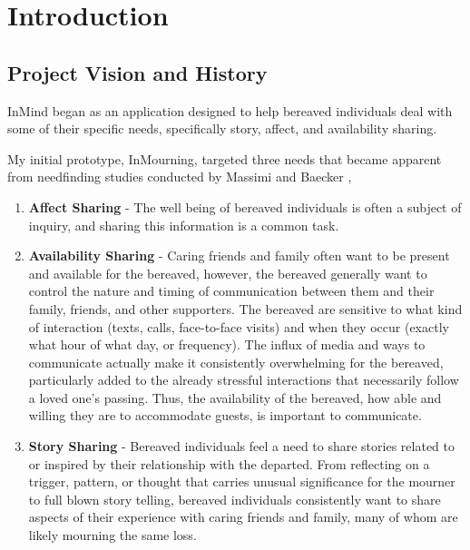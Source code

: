 \chapter{Introduction}
\section{Project Vision and History}
\label{sec:vision}
  InMind began as an application designed to help bereaved individuals deal with
  some of their specific needs, specifically story, affect, and availability sharing.

  My initial prototype, InMourning, targeted three needs that became apparent
  from needfinding studies conducted by Massimi and
  Baecker \cite{mm11a, mm10, mm13},

  \begin{enumerate}
  \item \textbf{Affect Sharing} - The well being of bereaved individuals is often a subject
    of inquiry, and sharing this information is a common task.
  \item \textbf{Availability Sharing} -
    Caring friends and family often want to be present
    and available for the bereaved, however,
    the bereaved generally want to control the nature and timing of communication between
    them and their family, friends, and other supporters.
    The bereaved are sensitive to what kind
    of interaction (texts, calls, face-to-face visits) and when they occur (exactly
    what hour of what day, or frequency). The influx of media and ways to
    communicate actually make it consistently overwhelming for the bereaved,
    particularly added to the already stressful interactions that necessarily
    follow a loved one's passing.
    Thus, the availability of the bereaved, how able and willing they are
    to accommodate guests, is important to communicate.
  \item \textbf{Story Sharing} - Bereaved individuals feel a need to share stories related to
    or inspired by their relationship with the departed.
    From reflecting on a trigger, pattern, or thought that carries unusual
    significance for the mourner to full blown story telling, bereaved individuals
    consistently want to share aspects of their experience with caring friends and
    family, many of whom are likely mourning the same loss.
  \end{enumerate}

